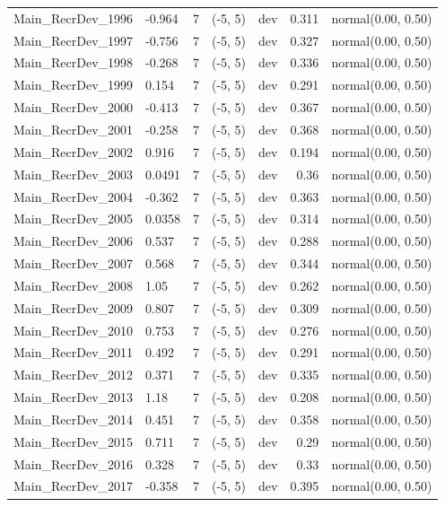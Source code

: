 \documentclass[
]{scrartcl}
\begin{document}
\begin{longtable}{llrllrl}
Main\_RecrDev\_1996 & -0.964 & 7 & (-5, 5) & dev & 0.311 & normal(0.00, 0.50) \\ 
Main\_RecrDev\_1997 & -0.756 & 7 & (-5, 5) & dev & 0.327 & normal(0.00, 0.50) \\ 
Main\_RecrDev\_1998 & -0.268 & 7 & (-5, 5) & dev & 0.336 & normal(0.00, 0.50) \\ 
Main\_RecrDev\_1999 & 0.154 & 7 & (-5, 5) & dev & 0.291 & normal(0.00, 0.50) \\ 
Main\_RecrDev\_2000 & -0.413 & 7 & (-5, 5) & dev & 0.367 & normal(0.00, 0.50) \\ 
Main\_RecrDev\_2001 & -0.258 & 7 & (-5, 5) & dev & 0.368 & normal(0.00, 0.50) \\ 
Main\_RecrDev\_2002 & 0.916 & 7 & (-5, 5) & dev & 0.194 & normal(0.00, 0.50) \\ 
Main\_RecrDev\_2003 & 0.0491 & 7 & (-5, 5) & dev & 0.36 & normal(0.00, 0.50) \\ 
Main\_RecrDev\_2004 & -0.362 & 7 & (-5, 5) & dev & 0.363 & normal(0.00, 0.50) \\ 
Main\_RecrDev\_2005 & 0.0358 & 7 & (-5, 5) & dev & 0.314 & normal(0.00, 0.50) \\ 
Main\_RecrDev\_2006 & 0.537 & 7 & (-5, 5) & dev & 0.288 & normal(0.00, 0.50) \\ 
Main\_RecrDev\_2007 & 0.568 & 7 & (-5, 5) & dev & 0.344 & normal(0.00, 0.50) \\ 
Main\_RecrDev\_2008 & 1.05 & 7 & (-5, 5) & dev & 0.262 & normal(0.00, 0.50) \\ 
Main\_RecrDev\_2009 & 0.807 & 7 & (-5, 5) & dev & 0.309 & normal(0.00, 0.50) \\ 
Main\_RecrDev\_2010 & 0.753 & 7 & (-5, 5) & dev & 0.276 & normal(0.00, 0.50) \\ 
Main\_RecrDev\_2011 & 0.492 & 7 & (-5, 5) & dev & 0.291 & normal(0.00, 0.50) \\ 
Main\_RecrDev\_2012 & 0.371 & 7 & (-5, 5) & dev & 0.335 & normal(0.00, 0.50) \\ 
Main\_RecrDev\_2013 & 1.18 & 7 & (-5, 5) & dev & 0.208 & normal(0.00, 0.50) \\ 
Main\_RecrDev\_2014 & 0.451 & 7 & (-5, 5) & dev & 0.358 & normal(0.00, 0.50) \\ 
Main\_RecrDev\_2015 & 0.711 & 7 & (-5, 5) & dev & 0.29 & normal(0.00, 0.50) \\ 
Main\_RecrDev\_2016 & 0.328 & 7 & (-5, 5) & dev & 0.33 & normal(0.00, 0.50) \\ 
Main\_RecrDev\_2017 & -0.358 & 7 & (-5, 5) & dev & 0.395 & normal(0.00, 0.50) \\ 

\end{longtable}
\end{document}
